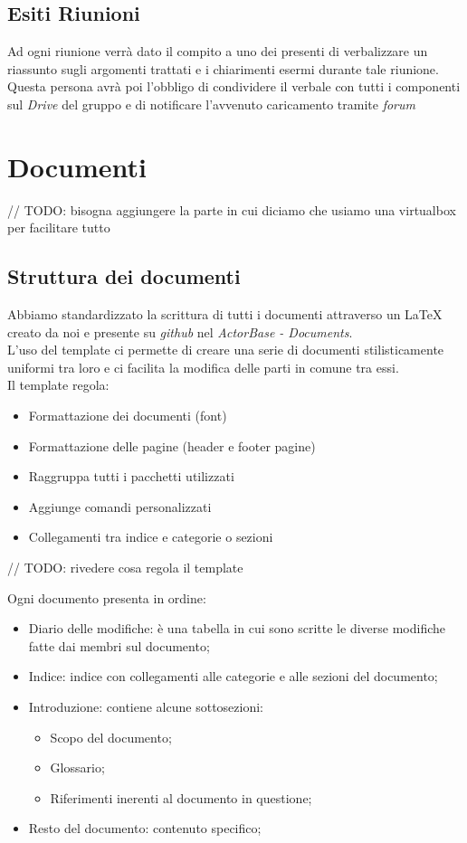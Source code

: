 \documentclass{scalatekids-article}
\begin{document}
\subsection{Esiti Riunioni}
Ad ogni riunione verrà dato il compito a uno dei presenti di verbalizzare un riassunto sugli argomenti trattati e i chiarimenti esermi durante tale riunione.\\
Questa persona avrà poi l'obbligo di condividere il verbale con tutti i componenti sul \textit{Drive} del gruppo e di notificare l'avvenuto caricamento tramite \textit{forum}

\section{Documenti}
// TODO: bisogna aggiungere la parte in cui diciamo che usiamo una virtualbox per facilitare tutto

\subsection{Struttura dei documenti}
Abbiamo standardizzato la scrittura di tutti i documenti attraverso un  \LaTeX\xspace creato da noi e presente su \textit{github} nel  \textit{ActorBase - Documents}.\\
L'uso del template ci permette di creare una serie di documenti stilisticamente uniformi tra loro e ci facilita la modifica delle parti in comune tra essi.\\
Il template regola:
\begin{itemize}
\item Formattazione dei documenti (font)
\item Formattazione delle pagine (header e footer pagine)
\item Raggruppa tutti i pacchetti utilizzati
\item Aggiunge comandi personalizzati
\item Collegamenti tra indice e categorie o sezioni
\end{itemize}
// TODO: rivedere cosa regola il template

Ogni documento presenta in ordine:
\begin{itemize}
\item Diario delle modifiche: è una tabella in cui sono scritte le diverse modifiche fatte dai membri sul documento;
\item Indice: indice con collegamenti alle categorie e alle sezioni del documento;
\item Introduzione: contiene alcune sottosezioni:
  \begin{itemize}
  \item Scopo del documento;
  \item Glossario;
  \item Riferimenti inerenti al documento in questione;
  \end{itemize}
\item Resto del documento: contenuto specifico;
\end{itemize}
\end{document}
